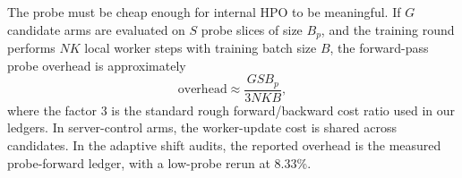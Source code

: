 The probe must be cheap enough for internal HPO to be meaningful. If $G$
candidate arms are evaluated on $S$ probe slices of size $B_p$, and the
training round performs $N K$ local worker steps with training batch size $B$,
the forward-pass probe overhead is approximately
\begin{equation}
\mathrm{overhead}
  \approx
  \frac{G S B_p}{3 N K B},
\end{equation}
where the factor $3$ is the standard rough forward/backward cost ratio used in
our ledgers. In server-control arms, the worker-update cost is shared across
candidates. In the adaptive shift audits, the reported overhead is the measured
probe-forward ledger, with a low-probe rerun at 8.33\%.
